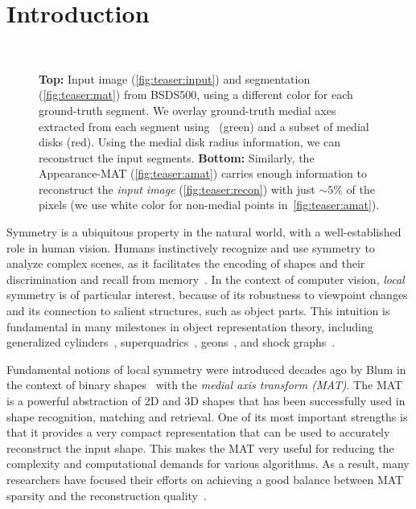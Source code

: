 \documentclass[10pt,twocolumn,letterpaper]{article}
\begin{document}
\section{Introduction}\label{sec:introduction}
\begin{figure}[!t]
\centering
{}
 \\
\caption{\textbf{Top:} Input image (\ref{fig:teaser:input}) and segmentation (\ref{fig:teaser:mat}) from BSDS500,
using a different color for each ground-truth segment. 
We overlay ground-truth medial axes extracted from each segment using~\cite{telea2002augmented} (green) and a subset of medial disks (red). 
Using the medial disk radius information, we can reconstruct the input segments. 
\textbf{Bottom:} Similarly, the Appearance-MAT (\ref{fig:teaser:amat}) carries enough information to reconstruct the 
 \emph{input image} (\ref{fig:teaser:recon}) with just $\sim 5\%$ of the pixels 
 (we use white color for non-medial points in~\ref{fig:teaser:amat}).}
\label{fig:teaser}
\end{figure}


Symmetry is a ubiquitous property in the natural world, with a well-established role in human vision.
Humans instinctively recognize and use symmetry to analyze complex scenes, as it facilitates the encoding of shapes and
their discrimination and recall from memory~\cite{barlow1979versatility,royer1981detection,wagemans1998parallel}.
In the context of computer vision, \emph{local} symmetry is of particular interest, 
because of its robustness to viewpoint changes and its connection to salient structures, such as object parts.
This intuition is fundamental in many milestones in object representation theory, including generalized
cylinders~\cite{binford1971visual}, superquadrics~\cite{barr1981superquadrics}, 
geons~\cite{biederman1987recognition}, and shock graphs~\cite{siddiqi1999shock}.

Fundamental notions of local symmetry were introduced decades ago by Blum in the context 
of binary shapes~\cite{blum1967transformation,blum1973biological} with the \emph{medial axis transform (MAT)}.
The MAT is a powerful abstraction of 2D and 3D shapes 
that has been successfully used in shape recognition, matching and retrieval. 
One of its most important strengths is that it provides a very compact representation that can
be used to accurately reconstruct the input shape. 
This makes the MAT very useful for reducing the complexity and computational demands for various algorithms.
As a result, many researchers have focused their efforts on achieving a good balance
between MAT sparsity and the reconstruction quality~\cite{tam2003shape,li2015q}.
\end{document}
